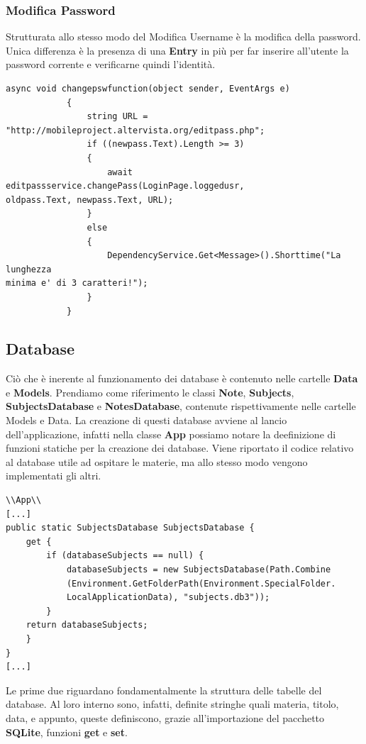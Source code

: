\documentclass[a4paper, 50pt, twoside]{article}
\begin{document}
\subsubsection{Modifica Password}
Strutturata allo stesso modo del Modifica Username è la modifica della password. Unica differenza è la presenza di una \textbf{Entry} in più per far inserire all'utente la password corrente e verificarne quindi l'identità. 
\begin{lstlisting}
async void changepswfunction(object sender, EventArgs e)
            {
                string URL = 
"http://mobileproject.altervista.org/editpass.php";
                if ((newpass.Text).Length >= 3)
                {
                    await editpassservice.changePass(LoginPage.loggedusr, 
oldpass.Text, newpass.Text, URL);
                }
                else
                {
                    DependencyService.Get<Message>().Shorttime("La lunghezza 
minima e' di 3 caratteri!");
                }
            }
\end{lstlisting}
\subsection{Database}
Ciò che è inerente al funzionamento dei database è contenuto nelle cartelle \textbf{Data} e \textbf{Models}. Prendiamo come riferimento le classi \textbf{Note}, \textbf{Subjects}, \textbf{SubjectsDatabase} e \textbf{NotesDatabase}, contenute rispettivamente nelle cartelle Models e Data.
La creazione di questi database avviene al lancio dell'applicazione, infatti nella classe \textbf{App} possiamo notare la deefinizione di funzioni statiche per la creazione dei database. Viene riportato il codice relativo al database utile ad ospitare le materie, ma allo stesso modo vengono implementati gli altri.

\begin{lstlisting}
\\App\\
[...]
public static SubjectsDatabase SubjectsDatabase {
	get {
		if (databaseSubjects == null) {
			databaseSubjects = new SubjectsDatabase(Path.Combine
			(Environment.GetFolderPath(Environment.SpecialFolder.
			LocalApplicationData), "subjects.db3"));
		}
	return databaseSubjects;
	}
}
[...]
\end{lstlisting}

Le prime due riguardano fondamentalmente la struttura delle tabelle del database. Al loro interno sono, infatti, definite stringhe quali materia, titolo, data, e appunto, queste definiscono, grazie all'importazione del pacchetto \textbf{SQLite}, funzioni \textbf{get} e \textbf{set}.
\end{document}
